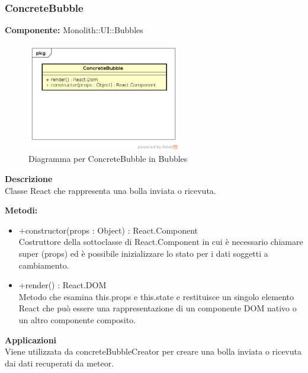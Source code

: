 \subsubsection{ConcreteBubble}
\textbf{Componente:}  Monolith::UI::Bubbles\\
   \FloatBarrier
   \begin{figure}[ht]
   \centering
   \includegraphics[width=0.6\textwidth]{img/single-ConcreteBubble}
   \caption{{Diagramma per ConcreteBubble in Bubbles}}
\end{figure}
\FloatBarrier
\textbf{Descrizione}\\
Classe React che rappresenta una bolla inviata o ricevuta.

\textbf{Metodi:} \begin{itemize}\item +constructor(props : Object) : React.Component \\Costruttore della sottoclasse di React.Component in cui è necessario chiamare super (props) ed è possibile inizializzare lo stato per i dati soggetti a cambiamento. 

\item +render() : React.DOM \\Metodo che esamina this.props e this.state e restituisce un singolo elemento React che può essere una rappresentazione di un componente DOM nativo o un altro componente composito.\end{itemize} 


\textbf{Applicazioni}\\
Viene utilizzata da concreteBubbleCreator per creare una bolla inviata o ricevuta dai dati recuperati da meteor. 


\clearpage

